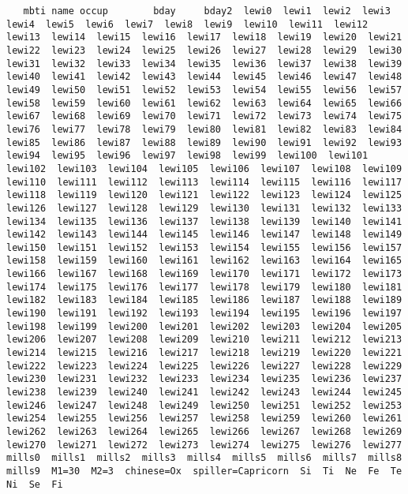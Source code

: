 \documentclass[12pt,fleqn]{article}\usepackage{../common}
\begin{document}
\begin{verbatim}
   mbti name occup        bday     bday2  lewi0  lewi1  lewi2  lewi3  lewi4  lewi5  lewi6  lewi7  lewi8  lewi9  lewi10  lewi11  lewi12  lewi13  lewi14  lewi15  lewi16  lewi17  lewi18  lewi19  lewi20  lewi21  lewi22  lewi23  lewi24  lewi25  lewi26  lewi27  lewi28  lewi29  lewi30  lewi31  lewi32  lewi33  lewi34  lewi35  lewi36  lewi37  lewi38  lewi39  lewi40  lewi41  lewi42  lewi43  lewi44  lewi45  lewi46  lewi47  lewi48  lewi49  lewi50  lewi51  lewi52  lewi53  lewi54  lewi55  lewi56  lewi57  lewi58  lewi59  lewi60  lewi61  lewi62  lewi63  lewi64  lewi65  lewi66  lewi67  lewi68  lewi69  lewi70  lewi71  lewi72  lewi73  lewi74  lewi75  lewi76  lewi77  lewi78  lewi79  lewi80  lewi81  lewi82  lewi83  lewi84  lewi85  lewi86  lewi87  lewi88  lewi89  lewi90  lewi91  lewi92  lewi93  lewi94  lewi95  lewi96  lewi97  lewi98  lewi99  lewi100  lewi101  lewi102  lewi103  lewi104  lewi105  lewi106  lewi107  lewi108  lewi109  lewi110  lewi111  lewi112  lewi113  lewi114  lewi115  lewi116  lewi117  lewi118  lewi119  lewi120  lewi121  lewi122  lewi123  lewi124  lewi125  lewi126  lewi127  lewi128  lewi129  lewi130  lewi131  lewi132  lewi133  lewi134  lewi135  lewi136  lewi137  lewi138  lewi139  lewi140  lewi141  lewi142  lewi143  lewi144  lewi145  lewi146  lewi147  lewi148  lewi149  lewi150  lewi151  lewi152  lewi153  lewi154  lewi155  lewi156  lewi157  lewi158  lewi159  lewi160  lewi161  lewi162  lewi163  lewi164  lewi165  lewi166  lewi167  lewi168  lewi169  lewi170  lewi171  lewi172  lewi173  lewi174  lewi175  lewi176  lewi177  lewi178  lewi179  lewi180  lewi181  lewi182  lewi183  lewi184  lewi185  lewi186  lewi187  lewi188  lewi189  lewi190  lewi191  lewi192  lewi193  lewi194  lewi195  lewi196  lewi197  lewi198  lewi199  lewi200  lewi201  lewi202  lewi203  lewi204  lewi205  lewi206  lewi207  lewi208  lewi209  lewi210  lewi211  lewi212  lewi213  lewi214  lewi215  lewi216  lewi217  lewi218  lewi219  lewi220  lewi221  lewi222  lewi223  lewi224  lewi225  lewi226  lewi227  lewi228  lewi229  lewi230  lewi231  lewi232  lewi233  lewi234  lewi235  lewi236  lewi237  lewi238  lewi239  lewi240  lewi241  lewi242  lewi243  lewi244  lewi245  lewi246  lewi247  lewi248  lewi249  lewi250  lewi251  lewi252  lewi253  lewi254  lewi255  lewi256  lewi257  lewi258  lewi259  lewi260  lewi261  lewi262  lewi263  lewi264  lewi265  lewi266  lewi267  lewi268  lewi269  lewi270  lewi271  lewi272  lewi273  lewi274  lewi275  lewi276  lewi277  mills0  mills1  mills2  mills3  mills4  mills5  mills6  mills7  mills8  mills9  M1=30  M2=3  chinese=Ox  spiller=Capricorn  Si  Ti  Ne  Fe  Te  Ni  Se  Fi

\end{verbatim}
\end{document}
